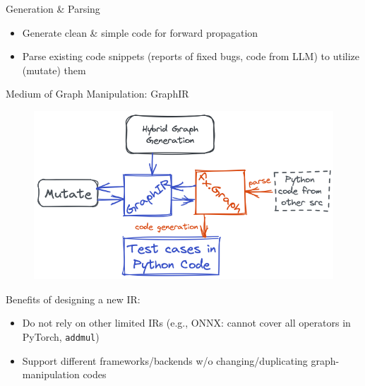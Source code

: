 \documentclass{beamer}
\begin{document}
\begin{frame}{Generation \& Parsing}
    \begin{itemize}
        \item Generate clean \& simple code for forward propagation
        \item Parse existing code snippets (reports of fixed bugs, code from LLM) to utilize (mutate) them
    \end{itemize}
    Medium of Graph Manipulation: GraphIR
    \begin{figure}
        \centering
        \includegraphics[scale=0.2]{figs/parse_gen.png}
        \label{fig:parse_gen}
    \end{figure}
    Benefits of designing a new IR:
    \begin{itemize}
        \item Do not rely on other limited IRs (e.g., ONNX: cannot cover all operators in PyTorch, \texttt{addmul})
        \item Support different frameworks/backends w/o changing/duplicating graph-manipulation codes
    \end{itemize}
\end{frame}
\end{document}
